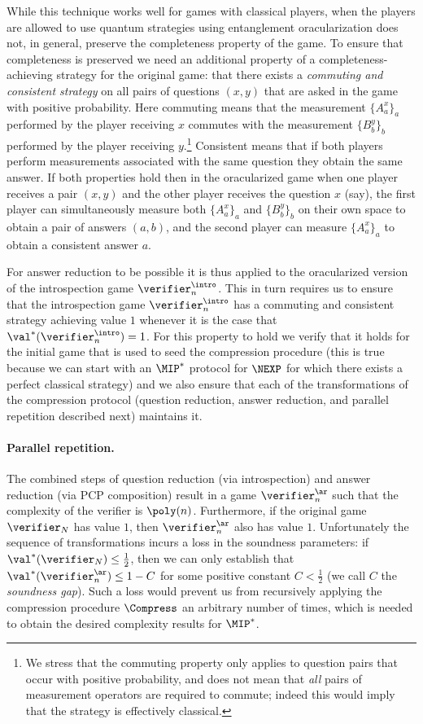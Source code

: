 While this technique works well for games with classical players, when the players are allowed to use quantum strategies using entanglement oracularization does not, in general, preserve the completeness property of the game. To ensure that completeness is preserved we need an additional property of a completeness-achieving strategy for the original game: that there exists a \emph{commuting and consistent strategy} on all pairs of questions $(x,y)$ that are asked in the game with positive probability. Here commuting means that the measurement $\{A^x_a\}_a$ performed by the player receiving $x$ commutes with the measurement $\{B^y_b\}_b$ performed by the player receiving $y$.\footnote{We stress that the commuting property only applies to question pairs that occur with positive probability, and does not mean that \emph{all} pairs of measurement operators are required to commute; indeed this would imply that the strategy is effectively classical.} Consistent means that if both players perform measurements associated with the same question they obtain the same answer. If both properties hold then in the oracularized game when one player receives a pair $(x,y)$ and the other player receives the question $x$ (say), the first player can simultaneously measure both $\{A^x_a\}_a$ and $\{B^y_b\}_b$ on their own space to obtain a pair of answers $(a,b)$, and the second player can measure $\{A^x_a\}_a$ to obtain a consistent answer $a$.

For answer reduction to be possible it is thus applied to the {oracularized} version of the introspection game $\verifier^\intro_n$. This in turn requires us to ensure that the introspection game $\verifier^\intro_n$ has a commuting and consistent strategy achieving value $1$ whenever it is the case that $\val^*(\verifier_n^\intro)=1$. For this property to hold we verify that it holds for the initial game that is used to seed the compression procedure (this is true because we can start with an $\MIP^*$ protocol for $\NEXP$ for which there exists a perfect classical strategy) and we also ensure that each of the transformations of the compression protocol (question reduction, answer reduction, and parallel repetition described next) maintains it.


\paragraph{Parallel repetition.}
The combined steps of question reduction (via introspection) and answer reduction (via PCP composition) result in a game $\verifier_n^\ar$ such that the complexity of the verifier is $\poly(n)$. Furthermore, if the original game $\verifier_N$ has value $1$, then $\verifier_n^\ar$ also has value $1$. Unfortunately the sequence of transformations incurs a loss in the soundness parameters: if $\val^*(\verifier_N) \leq \frac{1}{2}$, then we can only establish that $\val^*(\verifier^\ar_n) \leq 1 - C$ for some positive constant $C < \frac{1}{2}$ (we call $C$ the \emph{soundness gap}). Such a loss would prevent us from recursively applying the compression procedure $\Compress$ an arbitrary number of times, which is needed to obtain the desired complexity results for $\MIP^*$. 

